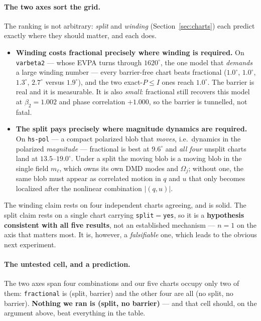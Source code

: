 \documentclass[11pt]{article}
\begin{document}
\paragraph{The two axes sort the grid.} The ranking is not arbitrary: \emph{split} and
\emph{winding} (Section~\ref{sec:charts}) each predict exactly where they should matter,
and each does.
\begin{itemize}
  \item \textbf{Winding costs fractional precisely where winding is required.} On
  \texttt{varbeta2} --- whose EVPA turns through $1620^\circ$, the one model that
  \emph{demands} a large winding number --- every barrier-free chart beats fractional
  ($1.0^\circ$, $1.0^\circ$, $1.3^\circ$, $2.7^\circ$ versus $1.9^\circ$), and the two
  exact-$P\!\le\!I$ ones reach $1.0^\circ$. The barrier is real and it is measurable. It
  is also \emph{small}: fractional still recovers this model at $\beta_2=1.002$ and phase
  correlation $+1.000$, so the barrier is tunnelled, not fatal.
  \item \textbf{The split pays precisely where magnitude dynamics are required.} On
  \texttt{hs-pol} --- a compact polarized blob that \emph{moves}, i.e.\ dynamics in the
  polarized \emph{magnitude} --- fractional is best at $9.6^\circ$ and \emph{all four}
  unsplit charts land at $13.5$--$19.0^\circ$. Under a split the moving blob is a moving
  blob in the single field $m_\ell$, which owns its own DMD modes and $\Omega_j$; without
  one, the same blob must appear as correlated motion in $q$ and $u$ that only becomes
  localized after the nonlinear combination $|(q,u)|$.
\end{itemize}
The winding claim rests on four independent charts agreeing, and is solid. The split claim
rests on a single chart carrying \texttt{split}${=}$\texttt{yes}, so it is a
\textbf{hypothesis consistent with all five results}, not an established mechanism ---
$n{=}1$ on the axis that matters most. It is, however, a \emph{falsifiable} one, which
leads to the obvious next experiment.

\paragraph{The untested cell, and a prediction.} The two axes span four combinations and
our five charts occupy only two of them: \texttt{fractional} is (split, barrier) and the
other four are all (no split, no barrier). \textbf{Nothing we ran is (split, no barrier)}
--- and that cell should, on the argument above, beat everything in the table.
\end{document}
